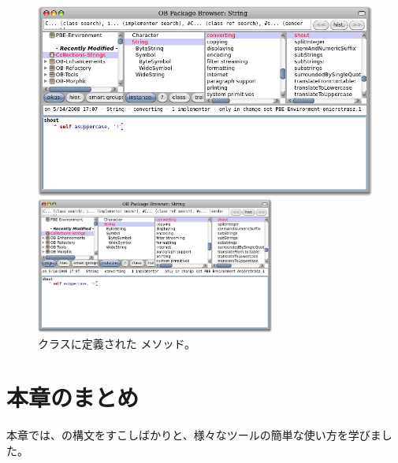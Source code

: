 \documentclass[a4paper,10pt,twoside]{book}
\begin{document}
\begin{figure}[hbt]
\ifluluelse
	{\centerline{\includegraphics[width=\textwidth]{String-Shout}}}
	{\centerline{\includegraphics[width=0.7\textwidth]{String-Shout}}}
\caption{ クラスに定義された  メソッド。
}
\end{figure}

\section{本章のまとめ}
本章では、\pharo の構文をすこしばかりと、様々なツールの簡単な使い方を学びました。
\end{document}
